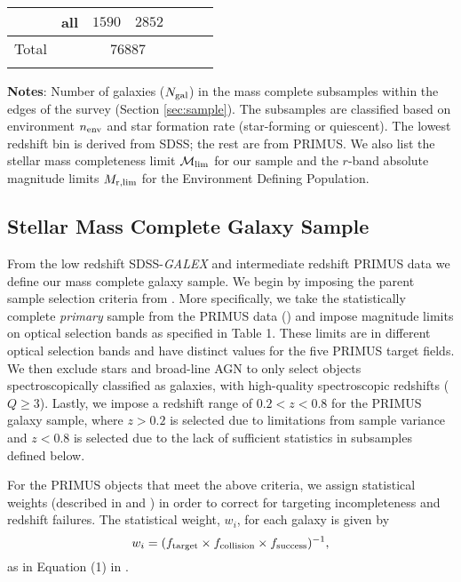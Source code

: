 \documentclass{emulateapj}
\begin{document}
\begin{table*}
\begin{center}
\begin{tabular}{ccccccc}
               & all              & $1590$                      & $2852$                          \\ \hline
Total &      & \multicolumn{2}{c}{76887} & \\ \hline
  \multicolumn{4}{l}{}                                             \\       
    \end{tabular} \par
    \end{center}
    {\bf Notes}: Number of galaxies ($N_{\rm{gal}}$) in the mass complete subsamples within the edges of the survey (Section \ref{sec:sample}). The subsamples are classified based on environment $n_{\rm{env}}$ and star formation rate (star-forming or quiescent). The lowest redshift bin is derived from SDSS; the rest are from PRIMUS. We also list the stellar mass completeness limit $\mathcal{M}_{\rm{lim}}$ for our sample and the $r$-band absolute magnitude limits $M_{\rm{r}, lim}$ for the Environment Defining Population. 
    \bigskip
\end{table*}

\subsection{Stellar Mass Complete Galaxy Sample} \label{sec:masscomp}
From the low redshift SDSS-{\em GALEX} and intermediate redshift
PRIMUS data we define our mass complete galaxy
sample. We begin by imposing the parent sample selection criteria from
\cite{Moustakas:2013aa}. More specifically, we take the statistically
complete {\em primary} sample from the PRIMUS data
(\citealt{Coil:2011aa}) and impose magnitude limits on optical
selection bands as specified in \cite{Moustakas:2013aa} Table 1. These
limits are in different optical selection bands and have distinct
values for the five PRIMUS target fields. We then exclude stars and
broad-line AGN to only select objects spectroscopically classified as
galaxies, with high-quality spectroscopic redshifts ($Q \geq
3$). Lastly, we impose a redshift range of $ 0.2 < z < 0.8$ for the
PRIMUS galaxy sample, where $ z > 0.2$ is selected due to limitations
from sample variance and $ z < 0.8$ is selected due to the lack of
sufficient statistics in subsamples defined below.

For the PRIMUS objects that meet the above criteria, we assign statistical weights (described in \citealt{Coil:2011aa} and \citealt{Cool:2013aa}) in order to correct for targeting incompleteness and redshift failures. The statistical weight, $w_i$, for each galaxy is given by
\begin{equation}
w_{i} = (f_{\rm{target}} \times f_{\rm{collision}} \times f_{\rm{success}})^{-1},
\end{equation}
as in Equation (1) in \cite{Moustakas:2013aa}. 
\end{document}
